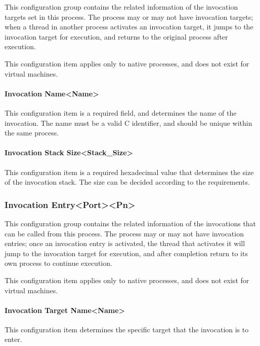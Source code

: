 This configuration group contains the related information of the invocation targets set in this process. The process may or may not have invocation targets; when a thread in another process activates an invocation target, it jumps to the invocation target for execution, and returns to the original process after execution.

This configuration item applies only to native processes, and does not exist for virtual machines.

\paragraph{Invocation Name<Name>{}}\label{par:5-3-14-17-1}

This configuration item is a required field, and determines the name of the invocation. The name must be a valid C identifier, and should be unique within the same process.

\paragraph{Invocation Stack Size<Stack\_Size>{}}\label{par:5-3-14-17-2}

This configuration item is a required hexadecimal value that determines the size of the invocation stack. The size can be decided according to the requirements.

\subsubsection{Invocation Entry<Port><Pn>{}}\label{subsubsec:5-3-14-18}

This configuration group contains the related information of the invocations that can be called from this process. The process may or may not have invocation entries; once an invocation entry is activated, the thread that activates it will jump to the invocation target for execution, and after completion return to its own process to continue execution.

This configuration item applies only to native processes, and does not exist for virtual machines.

\paragraph{Invocation Target Name<Name>{}}\label{par:5-3-14-18-1}

This configuration item determines the specific target that the invocation is to enter.

